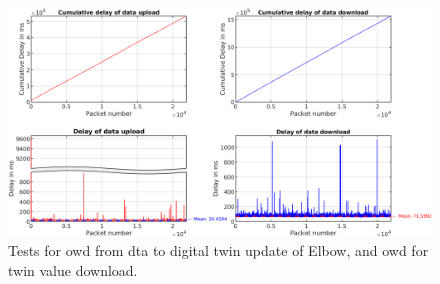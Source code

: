 \begin{figure}[htbp]
    \centering
    \includegraphics[width=\textwidth]{figures/appendix/DT/Delay_UploadDownload_Elbow.png}
    \caption{Tests for \gls{owd} from \gls{dta} to digital twin update of Elbow, 
    and \gls{owd} for twin value download. \label{fig: UD-sep-Elbow}}
\end{figure}




%

